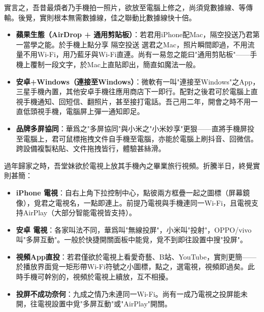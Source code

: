 


實言之，吾昔最煩者乃手機拍一照片，欲放至電腦上修之，尚須覓數據線、等傳輸。後覺，實則根本無需數據線，佳之聯動比數據線快十倍。

\begin{itemize}
  \item \textbf{蘋果生態（AirDrop + 通用剪貼板）}：若君用iPhone配Mac，隔空投送乃君第一當學之能。於手機上點分享 隔空投送 選君之Mac，照片瞬間即過，不用流量不用Wi-Fi，用乃藍牙與Wi-Fi直連。尚有一易忽之能曰"通用剪貼板"——手機上覆制一段文字，於Mac上直貼即出，簡直如魔法一般。
  \item \textbf{安卓+Windows（連接至Windows）}：微軟有一叫"連接至Windows"之App，三星手機內置，其他安卓手機往應用商店下一即行。配對之後君可於電腦上直視手機通知、回短信、翻照片，甚至接打電話。吾己用二年，開會之時不用一直低頭視手機，電腦屏上彈一通知即足。
  \item \textbf{品牌多屏協同}：華爲之"多屏協同"與小米之"小米妙享"更狠——直將手機屏投至電腦上，君可鼠標拖拽文件自手機至電腦，亦能於電腦上刷抖音、回微信。跨設備複製粘貼、文件拖拽皆行，體驗甚絲滑。
\end{itemize}


過年歸家之時，吾堂妹欲於電視上放其手機內之畢業旅行視頻。折騰半日，終覺實則甚簡：

\begin{itemize}
  \item \textbf{iPhone 電視}：自右上角下拉控制中心，點彼兩方框疊一起之圖標（屏幕鏡像），覓君之電視名，一點即連上。前提乃電視與手機連同一Wi-Fi，且電視支持AirPlay（大部分智能電視皆支持）。
  \item \textbf{安卓 電視}：各家叫法不同，華爲叫"無線投屏"，小米叫"投射"，OPPO/vivo叫"多屏互動"。一般於快捷開關面板中能覓，覓不到即往設置中搜"投屏"。
  \item \textbf{視頻App直投}：若君僅欲於電視上看愛奇藝、B站、YouTube，實則更簡——於播放界面覓一矩形帶Wi-Fi符號之小圖標，點之，選電視，視頻即過矣。此時手機可幹別的，視頻於電視上續放，互不相擾。
  \item \textbf{投屏不成功奈何}：九成之情乃未連同一Wi-Fi。尚有一成乃電視之投屏能未開，往電視設置中覓"多屏互動"或"AirPlay"開關。
\end{itemize}

